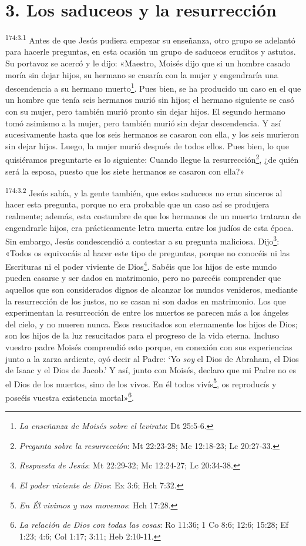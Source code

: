 \section*{3. Los saduceos y la resurrección}
\par 
\textsuperscript{174:3.1} Antes de que Jesús pudiera empezar su enseñanza, otro grupo se adelantó para hacerle preguntas, en esta ocasión un grupo de saduceos eruditos y astutos. Su portavoz se acercó y le dijo: «Maestro, Moisés dijo que si un hombre casado moría sin dejar hijos, su hermano se casaría con la mujer y engendraría una descendencia a su hermano muerto\footnote{\textit{La enseñanza de Moisés sobre el levirato}: Dt 25:5-6.}. Pues bien, se ha producido un caso en el que un hombre que tenía seis hermanos murió sin hijos; el hermano siguiente se casó con su mujer, pero también murió pronto sin dejar hijos. El segundo hermano tomó asimismo a la mujer, pero también murió sin dejar descendencia. Y así sucesivamente hasta que los seis hermanos se casaron con ella, y los seis murieron sin dejar hijos. Luego, la mujer murió después de todos ellos. Pues bien, lo que quisiéramos preguntarte es lo siguiente: Cuando llegue la resurrección\footnote{\textit{Pregunta sobre la resurrección}: Mt 22:23-28; Mc 12:18-23; Lc 20:27-33.}, ¿de quién será la esposa, puesto que los siete hermanos se casaron con ella?»

\par 
\textsuperscript{174:3.2} Jesús sabía, y la gente también, que estos saduceos no eran sinceros al hacer esta pregunta, porque no era probable que un caso así se produjera realmente; además, esta costumbre de que los hermanos de un muerto trataran de engendrarle hijos, era prácticamente letra muerta entre los judíos de esta época. Sin embargo, Jesús condescendió a contestar a su pregunta maliciosa. Dijo\footnote{\textit{Respuesta de Jesús}: Mt 22:29-32; Mc 12:24-27; Lc 20:34-38.}: «Todos os equivocáis al hacer este tipo de preguntas, porque no conocéis ni las Escrituras ni el poder viviente de Dios\footnote{\textit{El poder viviente de Dios}: Ex 3:6; Hch 7:32.}. Sabéis que los hijos de este mundo pueden casarse y ser dados en matrimonio, pero no parecéis comprender que aquellos que son considerados dignos de alcanzar los mundos venideros, mediante la resurrección de los justos, no se casan ni son dados en matrimonio. Los que experimentan la resurrección de entre los muertos se parecen más a los ángeles del cielo, y no mueren nunca. Esos resucitados son eternamente los hijos de Dios; son los hijos de la luz resucitados para el progreso de la vida eterna. Incluso vuestro padre Moisés comprendió esto porque, en conexión con sus experiencias junto a la zarza ardiente, oyó decir al Padre: `Yo \textit{soy} el Dios de Abraham, el Dios de Isaac y el Dios de Jacob.' Y así, junto con Moisés, declaro que mi Padre no es el Dios de los muertos, sino de los vivos. En él todos vivís\footnote{\textit{En Él vivimos y nos movemos}: Hch 17:28.}, os reproducís y poseéis vuestra existencia mortal»\footnote{\textit{La relación de Dios con todas las cosas}: Ro 11:36; 1 Co 8:6; 12:6; 15:28; Ef 1:23; 4:6; Col 1:17; 3:11; Heb 2:10-11.}.

